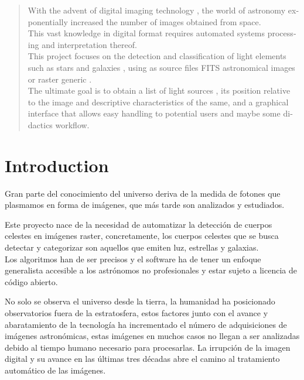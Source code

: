 	\begin{otherlanguage}{english}
	\begin{abstract}
		With the advent of digital imaging technology , the world of astronomy exponentially increased the number of images obtained from space.\\
		This vast knowledge in digital format requires automated systems processing and interpretation thereof.\\
		This project focuses on the detection and classification of light elements such as stars and galaxies , using as source files FITS astronomical images or raster generic .\\
		The ultimate goal is to obtain a list of light sources , its position relative to the image and descriptive characteristics of the same,  and a graphical interface that allows easy handling to potential users and maybe some didactics workflow.\\
	\end{abstract}
	\end{otherlanguage}
	\vfill %
	
	
	\section{Introduction}
	
	Gran parte del conocimiento del universo deriva de la medida de fotones que plasmamos en forma de imágenes, que más tarde son analizados y estudiados. 
	
	Este proyecto nace de la necesidad de automatizar la detección de cuerpos celestes en imágenes raster, concretamente, los cuerpos celestes que se busca detectar y categorizar son aquellos que emiten luz, estrellas y galaxias. \\
	Los algoritmos han de ser precisos y el software ha de tener un enfoque generalista accesible a los astrónomos no profesionales y estar sujeto a licencia de código abierto.
	
	No solo se observa el universo desde la tierra, la humanidad ha posicionado observatorios fuera de la estratosfera, estos factores junto con el avance y abaratamiento de la tecnología ha incrementado el número de adquisiciones de imágenes astronómicas, estas imágenes en muchos casos no llegan a ser analizadas debido al tiempo humano necesario para procesarlas. La irrupción de la imagen digital y su avance en las últimas tres décadas abre el camino al tratamiento automático de las imágenes.
	
